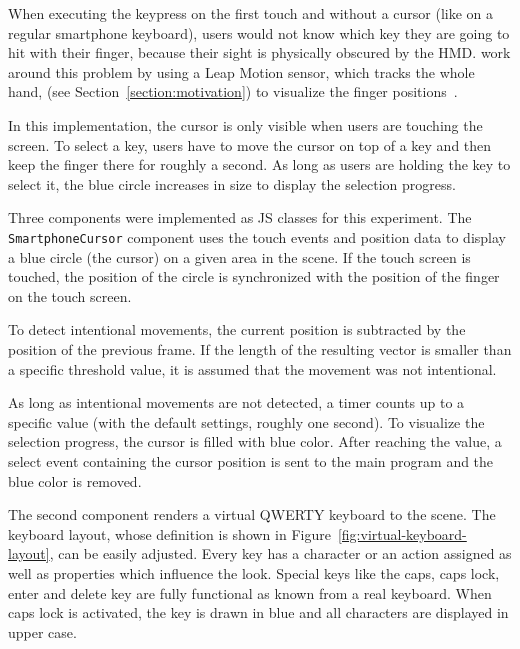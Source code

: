 When executing the keypress on the first touch and without a cursor (like on a regular smartphone keyboard), users would not know which key they are going to hit with their finger, because their sight is physically obscured by the \gls{HMD}. \citeauthor{Dias.2018} work around this problem by using a Leap Motion sensor, which tracks the whole hand, (see Section~\ref{section:motivation}) to visualize the finger positions~\cite[4]{Dias.2018}.

In this implementation, the cursor is only visible when users are touching the screen. To select a key, users have to move the cursor on top of a key and then keep the finger there for roughly a second. As long as users are holding the key to select it, the blue circle increases in size to display the selection progress.

Three components were implemented as \acrlong{JS} classes for this experiment. The \lstinline{SmartphoneCursor} component uses the touch events and position data to display a blue circle (the cursor) on a given area in the scene. If the touch screen is touched, the position of the circle is synchronized with the position of the finger on the touch screen.

To detect intentional movements, the current position is subtracted by the position of the previous frame. If the length of the resulting vector is smaller than a specific threshold value, it is assumed that the movement was not intentional.

As long as intentional movements are not detected, a timer counts up to a specific value (with the default settings, roughly one second). To visualize the selection progress, the cursor is filled with blue color. After reaching the value, a select event containing the cursor position is sent to the main program and the blue color is removed. 

The second component renders a virtual QWERTY keyboard to the scene. The keyboard layout, whose definition is shown in Figure~\ref{fig:virtual-keyboard-layout}, can be easily adjusted. Every key has a character or an action assigned as well as properties which influence the look. Special keys like the caps, caps lock, enter and delete key are fully functional as known from a real keyboard. When caps lock is activated, the key is drawn in blue and all characters are displayed in upper case.

